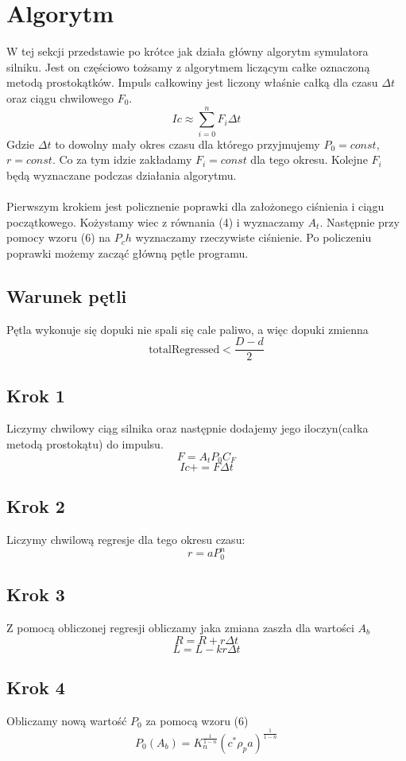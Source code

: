 \documentclass{article}
\begin{document}
\section{Algorytm}
W tej sekcji przedstawie po krótce jak działa główny algorytm symulatora silniku. Jest on częściowo tożsamy z algorytmem liczącym całke oznaczoną metodą prostokątków. Impuls całkowiny jest liczony właśnie całką dla czasu $\Delta t$ oraz ciągu chwilowego $F_0$.
$$Ic\approx \sum^n_{i=0}F_i\Delta t$$
Gdzie  $\Delta t$ to dowolny mały okres czasu dla którego przyjmujemy $P_0=const$, $r=const$. Co za tym idzie zakładamy $F_i=const$ dla tego okresu. Kolejne $F_i$ będą wyznaczane podczas działania algorytmu.\\\\
Pierwszym krokiem jest policznenie poprawki dla założonego ciśnienia i ciągu początkowego. Kożystamy wiec z równania (4) i wyznaczamy $A_t$. Następnie przy pomocy wzoru (6) na $P_ch$ wyznaczamy rzeczywiste ciśnienie.  Po policzeniu poprawki możemy zacząć główną pętle programu.

\subsection*{Warunek pętli}
Pętla wykonuje się dopuki nie spali się cale paliwo, a więc dopuki zmienna $$\mbox{totalRegressed} < \frac{D-d}{2}$$

\subsection*{Krok 1}
Liczymy chwilowy ciąg silnika oraz następnie dodajemy jego iloczyn(całka metodą prostokątu) do impulsu.
$$F=A_tP_0C_F$$
$$Ic+=F\Delta t$$

\subsection*{Krok 2}
Liczymy chwilową regresje dla tego okresu czasu:
$$r=aP_0^n$$

\subsection*{Krok 3}
Z pomocą obliczonej regresji obliczamy jaka zmiana zaszła dla wartości $A_b$
$$R=R+r\Delta t$$
$$L=L - kr\Delta t$$
\subsection*{Krok 4} 
Obliczamy nową wartość $P_0$ za pomocą wzoru (6)
$$P_0(A_b)=K_n^{\frac{1}{1-n}}(c^*\rho_pa)^{\frac{1}{1-n}}$$
\end{document}
